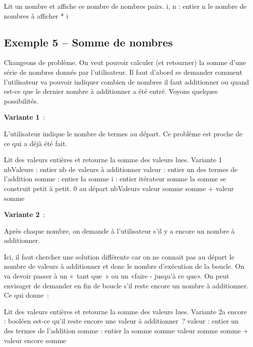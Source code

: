 		\begin{Pseudocode}
		\LComment Lit un nombre et affiche ce nombre de nombres pairs.
			\Decl i, n : entier
			\Read n
			\RComment le nombre de nombres à afficher
				 * i 
			\EndFor
		\EndModule
		\end{Pseudocode}

	\subsection{Exemple 5 -- Somme de nombres}

		Changeons de problème. On veut pouvoir calculer (et retourner)
		la somme d’une série de nombres donnés par
		l’utilisateur. Il faut d’abord se
		demander comment l’utilisateur va pouvoir indiquer
		combien de nombres il faut additionner ou quand est-ce que le dernier
		nombre à additionner a été entré. Voyons quelques possibilités.

		\medskip
		\textbf{Variante 1}~: 
		
		L’utilisateur indique le nombre de termes au départ.
		Ce problème est proche de ce qui a déjà été fait.
		
		\begin{Pseudocode}
		\LComment Lit des valeurs entières et retourne la somme des valeurs lues.
		 \RComment Variante 1
			\Decl nbValeurs : entier \RComment nb de valeurs à additionner
			\Decl valeur : entier \RComment un des termes de l’addition
			\Decl somme : entier \RComment la somme
			\Decl i : entier \RComment itérateur
			\Let somme  \RComment la somme se construit petit à petit. 0 au départ
			\Read nbValeurs
			\For{i \K{de} 1 \K{à} nbValeurs} 
				\Read valeur
				\Let somme \Gets somme + valeur 
			\EndFor
			\Return somme
		\EndModule
		\end{Pseudocode}

		\medskip
		\textbf{Variante 2}~: 
		
		Après chaque nombre, 
		on demande à l’utilisateur s’il y a encore un nombre à additionner.

		Ici, il faut chercher une solution différente
		car on ne connait pas au départ le nombre de valeurs à additionner et
		donc le nombre d’exécution de la boucle. On va devoir passer à un
		«~tant que~» ou un «faire - jusqu’à ce que». On peut
		envisager de demander en fin de boucle s’il reste
		encore un nombre à additionner. Ce qui donne~:

		\begin{Pseudocode}
		\LComment Lit des valeurs entières et retourne la somme des valeurs lues.
		 \RComment Variante 2a
			\Decl encore : booléen \RComment est-ce qu’il reste encore une valeur à additionner~?
			\Decl valeur : entier \RComment un des termes de l’addition
			\Decl somme : entier \RComment la somme
			\Let somme \Gets 0
			\Repeat 
				\Read valeur
				\Let somme \Gets somme + valeur 
				\Read encore
			\Until{NON encore}
			\Return somme
		\EndModule
		\end{Pseudocode}
		
